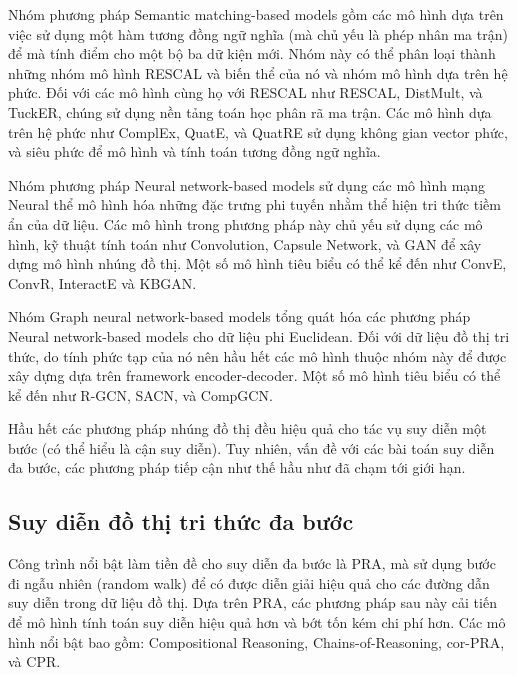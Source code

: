 Nhóm phương pháp Semantic matching-based models gồm các mô hình dựa trên việc sử dụng một hàm tương đồng ngữ nghĩa (mà chủ yếu là phép nhân ma trận) để mà
tính điểm cho một bộ ba dữ kiện mới. Nhóm này có thể phân loại thành những nhóm mô hình RESCAL và biến thể của nó và nhóm mô hình dựa trên hệ phức.
Đối với các mô hình cùng họ với RESCAL như RESCAL\cite{nickel2011three}, DistMult\cite{yang2014embedding}, và TuckER\cite{balavzevic2019tucker}, chúng sử dụng nền tảng toán học phân rã ma trận. Các mô hình dựa trên hệ phức như ComplEx\cite{trouillon2017knowledge},
QuatE\cite{zhang2019quaternion}, và QuatRE\cite{nguyen2022quatre} sử dụng không gian vector phức, và siêu phức để mô hình và tính toán tương đồng ngữ nghĩa.

Nhóm phương pháp Neural network-based models sử dụng các mô hình mạng Neural thể mô hình hóa những đặc trưng phi tuyến nhằm thể hiện tri thức tiềm ẩn của dữ liệu.
Các mô hình trong phương pháp này chủ yếu sử dụng các mô hình, kỹ thuật tính toán như Convolution, Capsule Network, và GAN để xây dựng mô hình nhúng đồ thị. Một số mô hình tiêu biểu 
có thể kể đến như ConvE\cite{dettmers2018convolutional}, ConvR\cite{jiang2019adaptive}, InteractE\cite{vashishth2020interacte} và KBGAN\cite{cai2017kbgan}.

Nhóm Graph neural network-based models tổng quát hóa các phương pháp Neural network-based models cho dữ liệu phi Euclidean. Đối với dữ liệu đồ thị tri thức, do tính phức tạp của nó
nên hầu hết các mô hình thuộc nhóm này để được xây dựng dựa trên framework encoder-decoder. Một số mô hình tiêu biểu có thể kể đến như R-GCN\cite{schlichtkrull2018modeling}, SACN\cite{shang2019end}, và CompGCN\cite{vashishth2019composition}.

Hầu hết các phương pháp nhúng đồ thị đều hiệu quả cho tác vụ suy diễn một bước (có thể hiểu là cận suy diễn). Tuy nhiên, vấn đề với các bài toán suy diễn đa bước, các phương pháp tiếp cận như thế hầu như đã chạm tới giới hạn.

\subsection{Suy diễn đồ thị tri thức đa bước}

Công trình nổi bật làm tiền đề cho suy diễn đa bước là  PRA, mà sử dụng bước đi ngẫu nhiên (random walk) để có được diễn giải hiệu quả cho các đường dẫn suy diễn trong dữ liệu đồ thị. Dựa trên PRA, các phương pháp sau này cải tiến để mô hình tính toán suy diễn hiệu quả hơn 
và bớt tốn kém chi phí hơn. Các mô hình nổi bật bao gồm: Compositional Reasoning\cite{neelakantan2015compositional}, Chains-of-Reasoning\cite{das2016chains},  cor-PRA\cite{lao2015learning}, và  CPR\cite{wang2016knowledge}.

